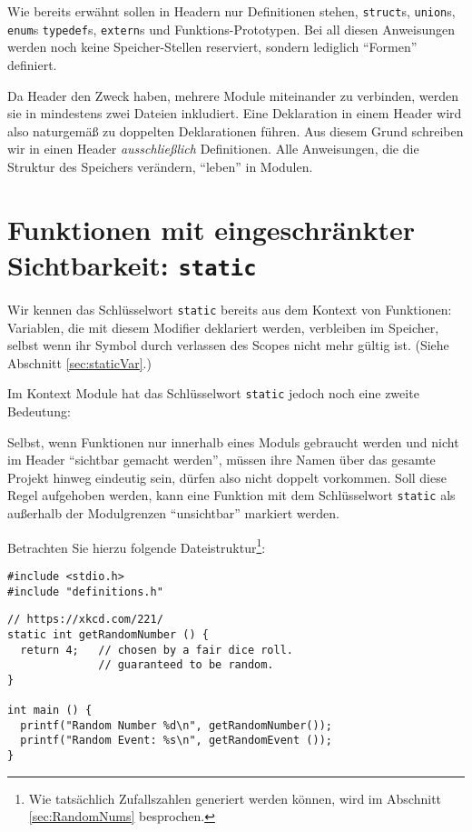 \begin{warnbox}
Wie bereits erwähnt sollen in Headern nur Definitionen stehen, \ie \texttt{struct}s, \texttt{union}s, \texttt{enum}s \texttt{typedef}s, \texttt{extern}s und Funktions-Prototypen. Bei all diesen Anweisungen werden noch keine Speicher-Stellen reserviert, sondern lediglich \enquote{Formen} definiert.

Da Header den Zweck haben, mehrere Module miteinander zu verbinden, werden sie in mindestens zwei Dateien inkludiert. Eine Deklaration in einem Header wird also naturgemäß zu doppelten Deklarationen führen. Aus diesem Grund schreiben wir in einen Header \emph{ausschließlich} Definitionen. Alle Anweisungen, die die Struktur des Speichers verändern, \enquote{leben} in Modulen.
\end{warnbox}

\section{Funktionen mit eingeschränkter Sichtbarkeit: \texttt{static}}
Wir kennen das Schlüsselwort \texttt{static} bereits aus dem Kontext von Funktionen: Variablen, die mit diesem Modifier deklariert werden, verbleiben im Speicher, selbst wenn ihr Symbol durch verlassen des Scopes nicht mehr gültig ist. (Siehe Abschnitt \ref{sec:staticVar}.)

Im Kontext Module hat das Schlüsselwort \texttt{static} jedoch noch eine zweite Bedeutung:

Selbst, wenn Funktionen nur innerhalb eines Moduls gebraucht werden und nicht im Header \enquote{sichtbar gemacht werden}, müssen ihre Namen über das gesamte Projekt hinweg eindeutig sein, dürfen also nicht doppelt vorkommen. Soll diese Regel aufgehoben werden, kann eine Funktion mit dem Schlüsselwort \texttt{static} als außerhalb der Modulgrenzen \enquote{unsichtbar} markiert werden.

Betrachten Sie hierzu folgende Dateistruktur\footnote{Wie tatsächlich Zufallszahlen generiert werden können, wird im Abschnitt \ref{sec:RandomNums} besprochen.}:

\begin{codebox}
\begin{verbatim}
#include <stdio.h>
#include "definitions.h"
\end{verbatim}
\end{codebox}
%
\begin{codebox}[]
\begin{verbatim}
// https://xkcd.com/221/
static int getRandomNumber () {
  return 4;   // chosen by a fair dice roll.
              // guaranteed to be random.
}

int main () {
  printf("Random Number %d\n", getRandomNumber());
  printf("Random Event: %s\n", getRandomEvent ());
}
\end{verbatim}
\end{codebox}


